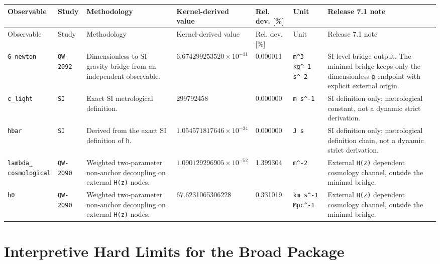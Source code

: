 \documentclass[11pt,a4paper]{article}
\begin{document}
\scriptsize
\begin{longtable}{@{}p{2.3cm}p{1.3cm}p{3.2cm}p{2.7cm}p{1.4cm}p{1.7cm}p{2.5cm}@{}}
\toprule
Observable & Study & Methodology & Kernel-derived value & Rel. dev. [\%] & Unit & Release 7.1 note \\
\midrule
\endfirsthead
\toprule
Observable & Study & Methodology & Kernel-derived value & Rel. dev. [\%] & Unit & Release 7.1 note \\
\midrule
\endhead
\texttt{G\_newton} & \texttt{QW-2092} & Dimensionless-to-SI gravity bridge from an independent observable. & $6.674299253520\times 10^{-11}$ & 0.000011 & \texttt{m\textasciicircum{}3 kg\textasciicircum{}-1 s\textasciicircum{}-2} & SI-level bridge output. The minimal bridge keeps only the dimensionless \texttt{g} endpoint with explicit external origin. \\
\texttt{c\_light} & \texttt{SI} & Exact SI metrological definition. & 299792458 & 0.000000 & \texttt{m s\textasciicircum{}-1} & SI definition only; metrological constant, not a dynamic strict derivation. \\
\texttt{hbar} & \texttt{SI} & Derived from the exact SI definition of \texttt{h}. & $1.054571817646\times 10^{-34}$ & 0.000000 & \texttt{J s} & SI definition only; metrological definition chain, not a dynamic strict derivation. \\
\shortstack[l]{\texttt{lambda\_}\\\texttt{cosmological}} & \texttt{QW-2090} & Weighted two-parameter non-anchor decoupling on external \texttt{H(z)} nodes. & $1.090129296905\times 10^{-52}$ & 1.399304 & \texttt{m\textasciicircum{}-2} & External \texttt{H(z)} dependent cosmology channel, outside the minimal bridge. \\
\texttt{h0} & \texttt{QW-2090} & Weighted two-parameter non-anchor decoupling on external \texttt{H(z)} nodes. & 67.6231065306228 & 0.331019 & \texttt{km s\textasciicircum{}-1 Mpc\textasciicircum{}-1} & External \texttt{H(z)} dependent cosmology channel, outside the minimal bridge. \\
\bottomrule
\end{longtable}
\normalsize
\setlength{\tabcolsep}{6pt}
\let\dimlessunit\undefined

\section{Interpretive Hard Limits for the Broad Package}
\end{document}
